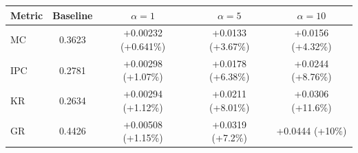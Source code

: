 \begin{tabular}{lcccc}
\toprule
Metric & Baseline & $\alpha=1$ & $\alpha=5$ & $\alpha=10$ \\
\midrule
MC & 0.3623 & +0.00232 (+0.641\%) & +0.0133 (+3.67\%) & +0.0156 (+4.32\%) \\
IPC & 0.2781 & +0.00298 (+1.07\%) & +0.0178 (+6.38\%) & +0.0244 (+8.76\%) \\
KR & 0.2634 & +0.00294 (+1.12\%) & +0.0211 (+8.01\%) & +0.0306 (+11.6\%) \\
GR & 0.4426 & +0.00508 (+1.15\%) & +0.0319 (+7.2\%) & +0.0444 (+10\%) \\
\bottomrule
\end{tabular}
